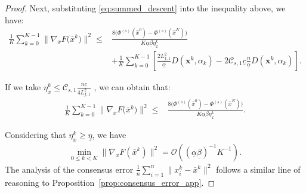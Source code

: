 \documentclass{article}
\theoremstyle{plain}
\theoremstyle{definition}
\theoremstyle{remark}
\begin{document}
\begin{proof}
    Next, substituting \eqref{eq:summed_descent} into the inequality above, we have:
    \begin{align*}
        \frac{1}{K} \sum_{k=0}^{K-1}\big\|\nabla_{x} F\big({\bar{x}}^k\big) \big\|^{2} 
        \leq{}& \frac{8\big(\Phi^{(s)}({\hat{x}}^{0}) - \Phi^{(s)}({\hat{x}}^{K}) \big)}{K \underline{\alpha}\underline{\beta}\eta_{x}^{k}} \\
        &+ \frac{1}{K} \sum_{k=0}^{K-1} \left[ \frac{2 L_{f,1}^{2}}{\underline{\alpha}} D(\mathbf{x}^{k},\alpha_{k}) - 2\mathcal{C}_{s,1}\underline{c} \frac{n}{\underline{\alpha}} D(\mathbf{x}^{k},\alpha_{k}) \right].
    \end{align*}
    
    If we take $\eta_{x}^{k}\leq \mathcal{C}_{s,1}  \frac{n\underline{c}}{4L_{f,1}^{2}}$ , we can obtain that:
    \begin{align*}
        \frac{1}{K} \sum_{k=0}^{K-1}\big\|\nabla_{x} F\big({\bar{x}}^k\big) \big\|^{2} 
        \leq{}& \frac{8\big(\Phi^{(s)}({\hat{x}}^{0}) - \Phi^{(s)}({\hat{x}}^{K}) \big)}{K \underline{\alpha}\underline{\beta}\eta_{x}^{k}}.
    \end{align*}
    
    Considering that $\eta_{x}^{k}\geq \underline{\eta}$, we have
    \begin{align}
        \min_{0 \le k < K} \|\nabla_{x} F(\bar{x}^k)\|^2 = \mathcal{O}\left( (\underline{\alpha}\underline{\beta})^{-1} K^{-1} \right).
    \end{align}
The analysis of the consensus error $\frac{1}{n}\sum_{i=1}^{n} \|x_{i}^{k} - \bar{x}^k\|^2$ follows a similar line of reasoning to Proposition~\ref{prop:consensus_error_app}. 
\end{proof}
\end{document}
